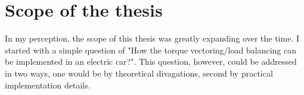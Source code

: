






\section{Scope of the thesis}
In my perception, the scope of this thesis was greatly expanding over the time. I started with a simple question of "How the torque vectoring/load balancing can be implemented in an electric car?". This question, however, could be addressed in two ways, one would be by theoretical divagations, second by practical implementation details.

